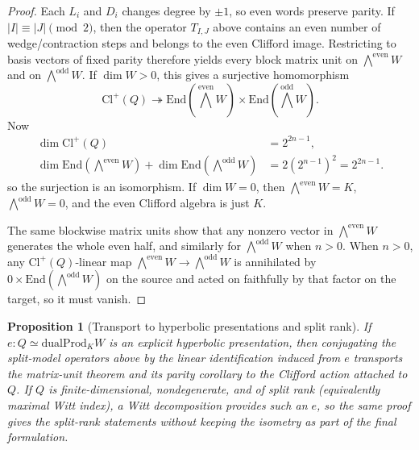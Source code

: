 \documentclass[11pt,a4paper]{article}
\theoremstyle{plain}
\newtheorem{proposition}[theorem]{Proposition}
\theoremstyle{definition}
\theoremstyle{remark}
\newcommand{\Cl}{\mathrm{Cl}}
\newcommand{\End}{\mathrm{End}}
\newcommand{\dualProd}{\mathrm{dualProd}}
\newcommand{\wedgeEven}{\bigwedge^{\mathrm{even}} W}
\newcommand{\wedgeOdd}{\bigwedge^{\mathrm{odd}} W}
\begin{document}
\begin{proof}
Each $L_i$ and $D_i$ changes degree by $\pm 1$, so even words preserve parity.
If $|I|\equiv |J|\pmod 2$, then the operator $T_{I,J}$ above contains an even
number of wedge/contraction steps and belongs to the even Clifford image.
Restricting to basis vectors of fixed parity therefore yields every block matrix
unit on $\wedgeEven$ and on $\wedgeOdd$. If $\dim W>0$, this gives a surjective
homomorphism
\[
  \Cl^+(Q)\twoheadrightarrow \End(\wedgeEven)\times \End(\wedgeOdd).
\]
Now
\[
  \begin{aligned}
  \dim \Cl^+(Q) &= 2^{2n-1}, \\
  \dim \End(\wedgeEven)+\dim \End(\wedgeOdd)
    &= 2(2^{n-1})^2 = 2^{2n-1}.
  \end{aligned}
\]
so the surjection is an isomorphism. If $\dim W=0$, then $\wedgeEven=K$,
$\wedgeOdd=0$, and the even Clifford algebra is just $K$.

The same blockwise matrix units show that any nonzero vector in $\wedgeEven$
generates the whole even half, and similarly for $\wedgeOdd$ when $n>0$.
When $n>0$, any $\Cl^+(Q)$-linear map $\wedgeEven\to\wedgeOdd$ is annihilated by
$0\times \End(\wedgeOdd)$ on the source and acted on faithfully by that factor
on the target, so it must vanish.
\end{proof}

\begin{proposition}[Transport to hyperbolic presentations and split rank]
\label{prop:transport-split}
If $e:Q \simeq \dualProd_K W$ is an explicit hyperbolic presentation, then
conjugating the split-model operators above by the linear identification
induced from $e$ transports the matrix-unit theorem and its parity corollary to
the Clifford action attached to $Q$. If $Q$ is finite-dimensional,
nondegenerate, and of split rank (equivalently maximal Witt index), a Witt decomposition provides
such an $e$, so the same proof gives the split-rank statements without keeping
the isometry as part of the final formulation.
\end{proposition}
\end{document}
